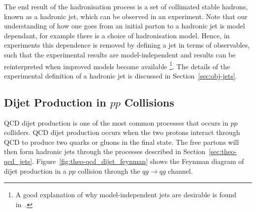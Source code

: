The end result of the hadronisation process is a set of collimated stable hadrons,
known as a hadronic jet, which can be observed in an experiment.
Note that our understanding of how one goes from an initial parton to a hadronic jet is model dependant,
for example there is a choice of hadronisation model.
Hence, in experiments this dependence is removed by defining a jet in terms of observables,
such that the experimental results are model-independent and results can be reinterpreted when improved models become available
\footnote{A good explanation of why model-independent jets are desirable is found in~\cite{theo-jets_jb}.}.
The details of the experimental definition of a hadronic jet is discussed in Section~\ref{sec:obj-jets}.


\subsection{Dijet Production in $pp$ Collisions}
\label{sec:theo-qcd_dijet}

QCD dijet production is one of the most common processes that occurs in $pp$ colliders.
QCD dijet production occurs when the two protons interact through QCD to produce two quarks or gluons in the final state.
The free partons will then form hadronic jets through the processes described in Section~\ref{sec:theo-qcd_jets}.
Figure~\ref{fig:theo-qcd_dijet_feynman} shows the Feynman diagram of
dijet production in a $pp$ collision through the $qg \to qg$ channel.

